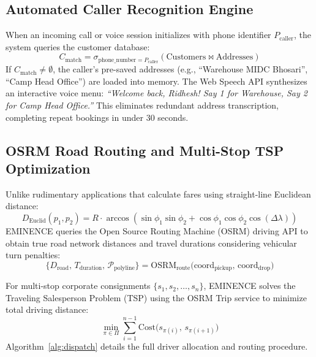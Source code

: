 \documentclass[conference]{IEEEtran}
\begin{document}
\subsection{Automated Caller Recognition Engine}
When an incoming call or voice session initializes with phone identifier $P_{\text{caller}}$, the system queries the customer database:
\begin{equation}
    C_{\text{match}} = \sigma_{\text{phone\_number} = P_{\text{caller}}}(\text{Customers} \bowtie \text{Addresses})
\end{equation}
If $C_{\text{match}} \neq \emptyset$, the caller's pre-saved addresses (e.g., ``Warehouse MIDC Bhosari'', ``Camp Head Office'') are loaded into memory. The Web Speech API synthesizes an interactive voice menu: \textit{``Welcome back, Ridhesh! Say 1 for Warehouse, Say 2 for Camp Head Office.''} This eliminates redundant address transcription, completing repeat bookings in under 30 seconds.

\subsection{OSRM Road Routing and Multi-Stop TSP Optimization}
Unlike rudimentary applications that calculate fares using straight-line Euclidean distance:
\begin{equation}
    D_{\text{Euclid}}(p_1, p_2) = R \cdot \arccos\left(\sin \phi_1 \sin \phi_2 + \cos \phi_1 \cos \phi_2 \cos(\Delta \lambda)\right)
\end{equation}
EMINENCE queries the Open Source Routing Machine (OSRM) driving API to obtain true road network distances and travel durations considering vehicular turn penalties:
\begin{equation}
    \{D_{\text{road}}, \, T_{\text{duration}}, \, \mathcal{P}_{\text{polyline}}\} = \text{OSRM}_{\text{route}}\big(\text{coord}_{\text{pickup}}, \, \text{coord}_{\text{drop}}\big)
\end{equation}

For multi-stop corporate consignments $\{s_1, s_2, \dots, s_n\}$, EMINENCE solves the Traveling Salesperson Problem (TSP) using the OSRM Trip service to minimize total driving distance:
\begin{equation}
    \min_{\pi \in \Pi} \sum_{i=1}^{n-1} \text{Cost}\big(s_{\pi(i)}, \, s_{\pi(i+1)}\big)
\end{equation}
Algorithm~\ref{alg:dispatch} details the full driver allocation and routing procedure.
\end{document}
